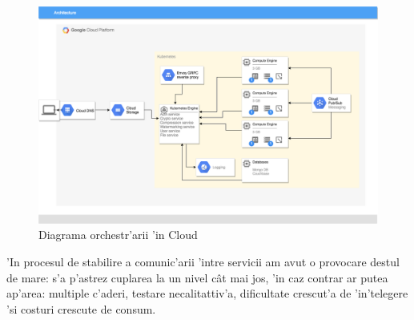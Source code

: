 \documentclass[12pt,a4paper,twoside]{report}
\begin{document}
\begin{figure}[H]
\begin{center}
\advance\leftskip-3cm
\advance\rightskip-3cm
\includegraphics[keepaspectratio=true,scale=0.4]{img/diagrama_cloud.png}
\caption{Diagrama orchestr'arii 'in Cloud}
\label{diagrama_cloud}
\end{center}
\end{figure}
'In procesul de stabilire a comunic'arii 'intre servicii am avut o provocare destul de mare: s'a p'astrez cuplarea la un nivel cât mai jos, 'in caz contrar ar putea ap'area: multiple c'aderi, testare necalitattiv'a, dificultate crescut'a de 'in'telegere 'si costuri crescute de consum.
\end{document}
